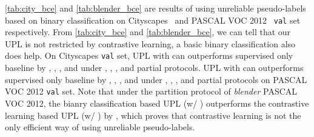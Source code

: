 \documentclass[10pt, twocolumn, letterpaper]{article}
\begin{document}
\cref{tab:city_bce} and \cref{tab:blender_bce} are results of using unreliable pseudo-labels based on binary classification on Cityscapes~\cite{cityscapes} and PASCAL VOC 2012~\cite{voc} \texttt{val} set respectively.
From \cref{tab:city_bce} and \cref{tab:blender_bce}, we can tell that our UPL is not restricted by contrastive learning, a basic binary classification also does help.
On Cityscapes \texttt{val} set, UPL with  can outperforms supervised only baseline by , , , and  under , , , and  partial protocols.
UPL with  can outperforms supervised only baseline by , , , and  under , , , and  partial protocols on PASCAL VOC 2012 \texttt{val} set.
Note that under the  partition protocol of \textit{blender} PASCAL VOC 2012, the bianry classification based UPL (w/ ) outperforms the contrastive learning based UPL (w/ ) by , which proves that contrastive learning is not the only efficient way of using unreliable pseudo-labels.


\begin{table}[t]
\centering
\caption{
Using unreliable pseudo-labels based on binary classification on \textbf{Cityscapes} \texttt{val} set under different partition protocols. 
}
\label{tab:city_bce}
\vspace{-8pt}
\vspace{-5pt}
\end{table}


\begin{table}[t]
\centering
\caption{
Using unreliable pseudo-labels based on binary classification on \textbf{PASCAL VOC 2012} \texttt{val} set under different splits. 
}
\label{tab:blender_bce}
\vspace{-8pt}
\vspace{-5pt}
\end{table}
\end{document}
